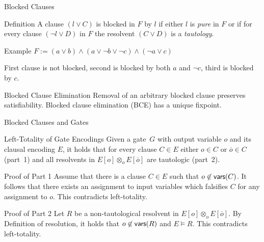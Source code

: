\documentclass[t]{sdqbeamer}
\begin{document}
    
    \begin{frame}{Blocked Clauses}
    \begin{block}{Definition}
    A clause $(l \lor C)$ is blocked in $F$ by $l$ if either $l$ is \emph{pure} in $F$ or if for every clause $(\lnot l \lor D)$ in $F$ the resolvent $(C \lor D)$ is a \emph{tautology}.
    \end{block}
    
    \begin{exampleblock}{Example}
    $F := (a \lor b) \land (a \lor \lnot b \lor \lnot c) \land (\lnot a \lor c)$
    
    First clause is not blocked, second is blocked by both $a$ and $\lnot c$, third is blocked by $c$.
    \end{exampleblock}
    
    \begin{block}{Blocked Clause Elimination}
    Removal of an arbitrary blocked clause preserves satisfiability. Blocked clause elimination (BCE) has a unique fixpoint.
    \end{block}
    \end{frame}
    
\begin{frame}{Blocked Clauses and Gates}
\begin{block}{Left-Totality of Gate Encodings}
    Given a gate~$G$ with output variable $o$ and its clausal encoding $E$, 
    it holds that for every clause $C \in E$ either $o \in C$ or $\overline o \in C$ (part~1)
    and all resolvents in $E[o] \otimes_o E[\overline o]$ are tautologic (part~2).
    \end{block}
    
    \begin{block}{Proof of Part 1}
    Assume that there is a clause $C \in E$ such that $o \not\in \textsf{vars} (C)$. 
    It follows that there exists an assignment to input variables which falsifies $C$ for any assignment to $o$. 
    This contradicts left-totality.
    \end{block}
    
    \begin{block}{Proof of Part 2}
    Let $R$ be a non-tautological resolvent in $E[o] \otimes_o E[\overline o]$. 
    By Definition of resolution, it holds that $o \not\in \textsf{vars} (R)$ and $E \models R$. 
    This contradicts left-totality. 
\end{block}
\end{frame}
    
\end{document}
